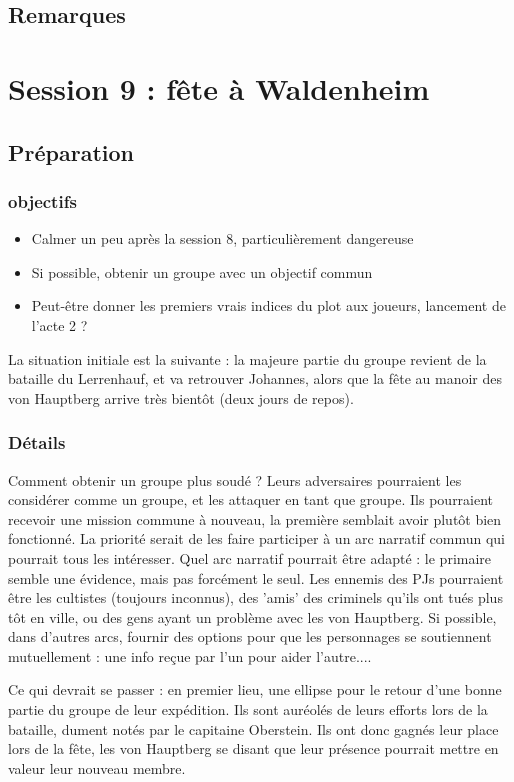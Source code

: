 \documentclass[10pt,a4paper]{book}
\begin{document}
\subsection{Remarques}
\section{Session 9 : fête à Waldenheim}
\subsection{Préparation}
\subsubsection{objectifs}
\begin{itemize}
\item Calmer un peu après la session 8, particulièrement dangereuse
\item Si possible, obtenir un groupe avec un objectif commun
\item Peut-être donner les premiers vrais indices du plot aux joueurs, lancement de l'acte 2 ?
\end{itemize}
La situation initiale est la suivante : la majeure partie du groupe revient de la bataille du Lerrenhauf, et va retrouver Johannes, alors que la fête au manoir des von Hauptberg arrive très bientôt (deux jours de repos).
\subsubsection{Détails}
Comment obtenir un groupe plus soudé ?
Leurs adversaires pourraient les considérer comme un groupe, et les attaquer en tant que groupe. Ils pourraient recevoir une mission commune à nouveau, la première semblait avoir plutôt bien fonctionné. La priorité serait de les faire participer à un arc narratif commun qui pourrait tous les intéresser. Quel arc narratif pourrait être adapté : le primaire semble une évidence, mais pas forcément le seul. Les ennemis des PJs pourraient être les cultistes (toujours inconnus), des 'amis' des criminels qu'ils ont tués plus tôt en ville, ou des gens ayant un problème avec les von Hauptberg. Si possible, dans d'autres arcs, fournir des options pour que les personnages se soutiennent mutuellement : une info reçue par l'un pour aider l'autre....

Ce qui devrait se passer : en premier lieu, une ellipse pour le retour d'une bonne partie du groupe de leur expédition. Ils sont auréolés de leurs efforts lors de la bataille, dument notés par le capitaine Oberstein. Ils ont donc gagnés leur place lors de la fête, les von Hauptberg se disant que leur présence pourrait mettre en valeur leur nouveau membre.
\end{document}
